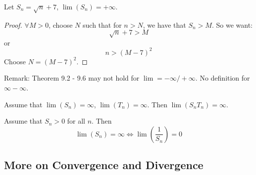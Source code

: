 \documentclass{report}
\begin{document}
\begin{examples}
    \begin{example}
        Let $S_{n} = \sqrt{n} + 7$, $\lim (S_{n}) = + \infty$. 
            \begin{proof}
                $\forall M > 0$, choose $N$ such that for $n > N$, we have that $S_{n} > M$. So we want:
                    \begin{equation*}
                        \sqrt{n} + 7 > M
                    \end{equation*}
                or 
                    \begin{equation*}
                        n >  (M - 7)^{2}
                    \end{equation*}
                Choose $N = (M - 7)^{2}$.
            \end{proof}
    \end{example}
\end{examples}

Remark: Theorem 9.2 - 9.6 may not hold for $\lim  = -\infty/ + \infty$. No definition for $\infty - \infty$.

\begin{theorem}{9.9}
    Assume that $\lim (S_{n}) = \infty$, $\lim (T_{n}) = \infty$. Then $\lim (S_{n}T_{n})= \infty$.
\end{theorem}

\begin{theorem}{9.10}
    Assume that $S_{n} > 0$ for all $n$. Then
        \begin{equation*}
            \lim (S_{n}) = \infty \iff \lim (\dfrac{1}{S_{n}}) = 0
        \end{equation*}
\end{theorem}

\begin{topic}
    \section{More on Convergence and Divergence}
\end{topic}
\end{document}
